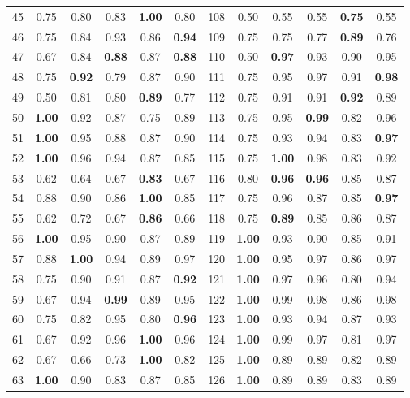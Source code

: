 \documentclass{article}
\begin{document}
{\begin{longtable}{cccccc@{\qquad}cccccc}
45 & 0.75 & 0.80 & 0.83 & \textbf{1.00} & 0.80 & 108 & 0.50 & 0.55 & 0.55 & \textbf{0.75} & 0.55 \\
46 & 0.75 & 0.84 & 0.93 & 0.86 & \textbf{0.94} & 109 & 0.75 & 0.75 & 0.77 & \textbf{0.89} & 0.76 \\
47 & 0.67 & 0.84 & \textbf{0.88} & 0.87 & \textbf{0.88} & 110 & 0.50 & \textbf{0.97} & 0.93 & 0.90 & 0.95 \\
48 & 0.75 & \textbf{0.92} & 0.79 & 0.87 & 0.90 & 111 & 0.75 & 0.95 & 0.97 & 0.91 & \textbf{0.98} \\
49 & 0.50 & 0.81 & 0.80 & \textbf{0.89} & 0.77 & 112 & 0.75 & 0.91 & 0.91 & \textbf{0.92} & 0.89 \\
50 & \textbf{1.00} & 0.92 & 0.87 & 0.75 & 0.89 & 113 & 0.75 & 0.95 & \textbf{0.99} & 0.82 & 0.96 \\
51 & \textbf{1.00} & 0.95 & 0.88 & 0.87 & 0.90 & 114 & 0.75 & 0.93 & 0.94 & 0.83 & \textbf{0.97} \\
52 & \textbf{1.00} & 0.96 & 0.94 & 0.87 & 0.85 & 115 & 0.75 & \textbf{1.00} & 0.98 & 0.83 & 0.92 \\
53 & 0.62 & 0.64 & 0.67 & \textbf{0.83} & 0.67 & 116 & 0.80 & \textbf{0.96} & \textbf{0.96} & 0.85 & 0.87 \\
54 & 0.88 & 0.90 & 0.86 & \textbf{1.00} & 0.85 & 117 & 0.75 & 0.96 & 0.87 & 0.85 & \textbf{0.97} \\
55 & 0.62 & 0.72 & 0.67 & \textbf{0.86} & 0.66 & 118 & 0.75 & \textbf{0.89} & 0.85 & 0.86 & 0.87 \\
56 & \textbf{1.00} & 0.95 & 0.90 & 0.87 & 0.89 & 119 & \textbf{1.00} & 0.93 & 0.90 & 0.85 & 0.91 \\
57 & 0.88 & \textbf{1.00} & 0.94 & 0.89 & 0.97 & 120 & \textbf{1.00} & 0.95 & 0.97 & 0.86 & 0.97 \\
58 & 0.75 & 0.90 & 0.91 & 0.87 & \textbf{0.92} & 121 & \textbf{1.00} & 0.97 & 0.96 & 0.80 & 0.94 \\
59 & 0.67 & 0.94 & \textbf{0.99} & 0.89 & 0.95 & 122 & \textbf{1.00} & 0.99 & 0.98 & 0.86 & 0.98 \\
60 & 0.75 & 0.82 & 0.95 & 0.80 & \textbf{0.96} & 123 & \textbf{1.00} & 0.93 & 0.94 & 0.87 & 0.93 \\
61 & 0.67 & 0.92 & 0.96 & \textbf{1.00} & 0.96 & 124 & \textbf{1.00} & 0.99 & 0.97 & 0.81 & 0.97 \\
62 & 0.67 & 0.66 & 0.73 & \textbf{1.00} & 0.82 & 125 & \textbf{1.00} & 0.89 & 0.89 & 0.82 & 0.89 \\
63 & \textbf{1.00} & 0.90 & 0.83 & 0.87 & 0.85 & 126 & \textbf{1.00} & 0.89 & 0.89 & 0.83 & 0.89 \\

\end{longtable}}
\end{document}
